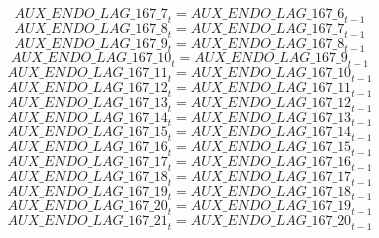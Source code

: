 \begin{dmath}
{AUX\_ENDO\_LAG\_167\_7}_{t}={AUX\_ENDO\_LAG\_167\_6}_{t-1}
\end{dmath}
\begin{dmath}
{AUX\_ENDO\_LAG\_167\_8}_{t}={AUX\_ENDO\_LAG\_167\_7}_{t-1}
\end{dmath}
\begin{dmath}
{AUX\_ENDO\_LAG\_167\_9}_{t}={AUX\_ENDO\_LAG\_167\_8}_{t-1}
\end{dmath}
\begin{dmath}
{AUX\_ENDO\_LAG\_167\_10}_{t}={AUX\_ENDO\_LAG\_167\_9}_{t-1}
\end{dmath}
\begin{dmath}
{AUX\_ENDO\_LAG\_167\_11}_{t}={AUX\_ENDO\_LAG\_167\_10}_{t-1}
\end{dmath}
\begin{dmath}
{AUX\_ENDO\_LAG\_167\_12}_{t}={AUX\_ENDO\_LAG\_167\_11}_{t-1}
\end{dmath}
\begin{dmath}
{AUX\_ENDO\_LAG\_167\_13}_{t}={AUX\_ENDO\_LAG\_167\_12}_{t-1}
\end{dmath}
\begin{dmath}
{AUX\_ENDO\_LAG\_167\_14}_{t}={AUX\_ENDO\_LAG\_167\_13}_{t-1}
\end{dmath}
\begin{dmath}
{AUX\_ENDO\_LAG\_167\_15}_{t}={AUX\_ENDO\_LAG\_167\_14}_{t-1}
\end{dmath}
\begin{dmath}
{AUX\_ENDO\_LAG\_167\_16}_{t}={AUX\_ENDO\_LAG\_167\_15}_{t-1}
\end{dmath}
\begin{dmath}
{AUX\_ENDO\_LAG\_167\_17}_{t}={AUX\_ENDO\_LAG\_167\_16}_{t-1}
\end{dmath}
\begin{dmath}
{AUX\_ENDO\_LAG\_167\_18}_{t}={AUX\_ENDO\_LAG\_167\_17}_{t-1}
\end{dmath}
\begin{dmath}
{AUX\_ENDO\_LAG\_167\_19}_{t}={AUX\_ENDO\_LAG\_167\_18}_{t-1}
\end{dmath}
\begin{dmath}
{AUX\_ENDO\_LAG\_167\_20}_{t}={AUX\_ENDO\_LAG\_167\_19}_{t-1}
\end{dmath}
\begin{dmath}
{AUX\_ENDO\_LAG\_167\_21}_{t}={AUX\_ENDO\_LAG\_167\_20}_{t-1}
\end{dmath}

